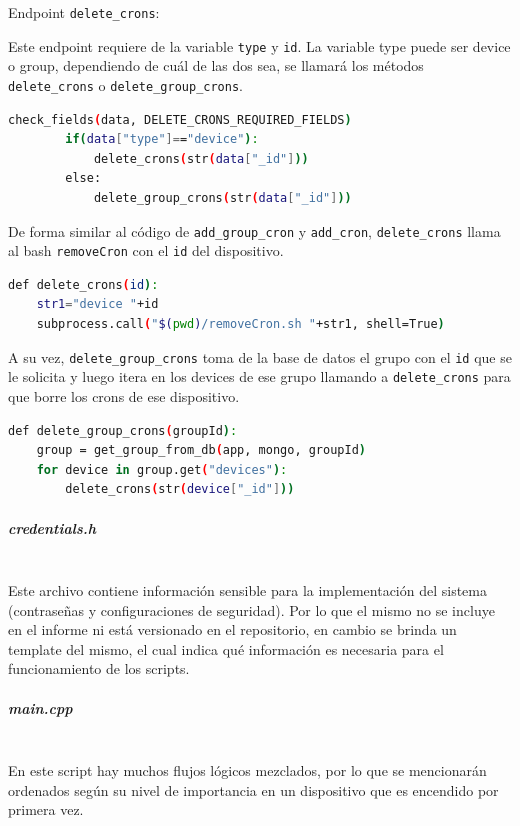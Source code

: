 Endpoint \lstinline[columns=fixed]{delete_crons}:

Este endpoint requiere de la variable \lstinline[columns=fixed]{type} y \lstinline[columns=fixed]{id}. La variable type puede ser device o group, dependiendo de cuál de las dos sea, se llamará los métodos \lstinline[columns=fixed]{delete_crons} o \lstinline[columns=fixed]{delete_group_crons}.

\begin{lstlisting}[language=bash]
check_fields(data, DELETE_CRONS_REQUIRED_FIELDS)
        if(data["type"]=="device"):
            delete_crons(str(data["_id"]))
        else:
            delete_group_crons(str(data["_id"]))
\end{lstlisting}

De forma similar al código de \lstinline[columns=fixed]{add_group_cron} y \lstinline[columns=fixed]{add_cron}, \lstinline[columns=fixed]{delete_crons} llama al bash \lstinline[columns=fixed]{removeCron} con el \lstinline[columns=fixed]{id} del dispositivo. 

\begin{lstlisting}[language=bash]
def delete_crons(id):
    str1="device "+id
    subprocess.call("$(pwd)/removeCron.sh "+str1, shell=True)
\end{lstlisting}

A su vez, \lstinline[columns=fixed]{delete_group_crons} toma de la base de datos el grupo con el \lstinline[columns=fixed]{id} que se le solicita y luego itera en los devices de ese grupo llamando a \lstinline[columns=fixed]{delete_crons} para que borre los crons de ese dispositivo.

\begin{lstlisting}[language=bash]
def delete_group_crons(groupId):
    group = get_group_from_db(app, mongo, groupId)
    for device in group.get("devices"):
        delete_crons(str(device["_id"]))
\end{lstlisting}

\subparagraph{credentials.h}\mbox{}\\
Este archivo contiene información sensible para la implementación del sistema (contraseñas y configuraciones de seguridad). Por lo que el mismo no se incluye en el informe ni está versionado en el repositorio, en cambio se brinda un template del mismo, el cual indica qué información es necesaria para el funcionamiento de los scripts.~


\subparagraph{main.cpp} ~\mbox{}\\
En este script hay muchos flujos lógicos mezclados, por lo que se mencionarán ordenados según su nivel de importancia en un dispositivo que es encendido por primera vez.

